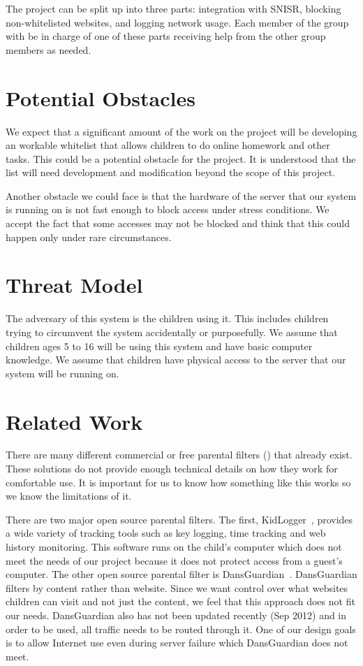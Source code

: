 \documentclass[12pt] {article}
\begin{document}
The project can be split up into three parts: integration with SNISR, blocking
non-whitelisted websites, and logging network usage. Each member of the group
with be in charge of one of these parts receiving help from the other group
members as needed.


\section*{Potential Obstacles}

We expect that a significant amount of the work on the project will be
developing an workable whitelist that allows children to do online homework and
other tasks. This could be a potential obstacle for the project. It is
understood that the list will need development and modification beyond the
scope of this project.

Another obstacle we could face is that the hardware of the server that our
system is running on is not fast enough to block access under stress
conditions. We accept the fact that some accesses may not be blocked and think
that this could happen only under rare circumstances.


\section*{Threat Model}
The adversary of this system is the children using it. This includes children
trying to circumvent the system accidentally or purposefully. We assume that
children ages 5 to 16 will be using this system and have basic computer
knowledge.  We assume that children have physical access to the server that our
system will be running on.


\section*{Related Work}
There are many different commercial or free parental filters
(\cite{k9}\cite{netnanny}\cite{mcafee}\cite{opendns}) that already exist. These
solutions do not provide enough technical details on how they work for
comfortable use. It is important for us to know how something like this works
so we know the limitations of it.

There are two major open source parental filters. The first,
KidLogger~\cite{kidlogger}, provides a wide variety of tracking tools such as
key logging, time tracking and web history monitoring. This software runs on
the child's computer which does not meet the needs of our project because it
does not protect access from a guest's computer. The other open source parental
filter is DansGuardian~\cite{dansgaurdian}. DansGuardian filters by content
rather than website. Since we want control over what websites children can
visit and not just the content, we feel that this approach does not fit our
needs.  DansGuardian also has not been updated recently (Sep 2012) and in order
to be used, all traffic needs to be routed through it. One of our design goals
is to allow Internet use even during server failure which DansGuardian does not
meet.
\end{document}
